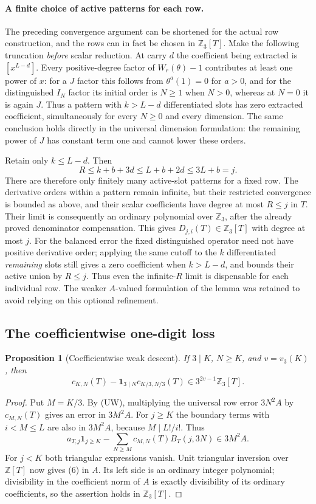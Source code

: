 \documentclass[11pt,a4paper]{article}
\newtheorem{proposition}[theorem]{Proposition}
\theoremstyle{definition}\newtheorem{definition}[theorem]{Definition}
\theoremstyle{remark}\newtheorem{remark}[theorem]{Remark}
\numberwithin{equation}{section}
\begin{document}
\paragraph{A finite choice of active patterns for each row.}
The preceding convergence argument can be shortened for the actual
row construction, and the rows can in fact be chosen in
$\mathbb Z_3[T]$.  Make the following truncation \emph{before}
scalar reduction.  At carry $d$ the coefficient being extracted is
$[x^{L-d}]$.  Every positive-degree factor of $W_r(\theta)-1$
contributes at least one power of $x$: for a $J$ factor this follows
from $\theta^a(1)=0$ for $a>0$, and for the distinguished $I_N$
factor its initial order is $N\ge1$ when $N>0$, whereas at $N=0$
it is again $J$.  Thus a pattern with $k>L-d$ differentiated slots
has zero extracted coefficient, simultaneously for every $N\ge0$
and every dimension.  The same conclusion holds directly in the
universal dimension formulation: the remaining power of $J$ has
constant term one and cannot lower these orders.

Retain only $k\le L-d$.  Then
\[
 R\le k+b+3d\le L+b+2d\le3L+b=j.
\]
There are therefore only finitely many active-slot patterns for a
fixed row.  The derivative orders within a pattern remain infinite,
but their restricted convergence is bounded as above, and their
scalar coefficients have degree at most $R\le j$ in $T$.
Their limit is consequently an ordinary polynomial over
$\mathbb Z_3$, after the already proved denominator compensation.
This gives $D_{j,i}(T)\in\mathbb Z_3[T]$ with degree at most $j$.
For the balanced error the fixed distinguished operator need not
have positive derivative order; applying the same cutoff to the
$k$ differentiated \emph{remaining} slots still gives a zero
coefficient when $k>L-d$, and bounds their active union by $R\le j$.
Thus even the infinite-$R$ limit is dispensable for each individual
row.  The weaker $A$-valued formulation of the lemma was retained
to avoid relying on this optional refinement.

\subsection{The coefficientwise one-digit loss}
\begin{proposition}[Coefficientwise weak descent]
If $3\mid K$, $N\ge K$, and $v=v_3(K)$, then
\[
 c_{K,N}(T)-\mathbf1_{3\mid N}c_{K/3,N/3}(T)
                       \in3^{2v-1}\mathbb Z_3[T].
\tag{6}
\]
\end{proposition}
\begin{proof}
Put $M=K/3$.  By (UW), multiplying the universal row error $3N^2A$
by $c_{M,N}(T)$ gives an error in $3M^2A$.  For $j\ge K$ the
boundary terms with $i<M\le L$ are also in $3M^2A$, because
$M\mid L!/i!$.  Thus
\[
 a_{T,j}\mathbf1_{j\ge K}
 -\sum_{N\ge M}c_{M,N}(T)B_T(j,3N)\in3M^2A.
\]
For $j<K$ both triangular expressions vanish.  Unit triangular
inversion over $\mathbb Z[T]$ now gives (6) in $A$.  Its left side
is an ordinary integer polynomial; divisibility in the coefficient
norm of $A$ is exactly divisibility of its ordinary coefficients,
so the assertion holds in $\mathbb Z_3[T]$.
\end{proof}
\end{document}
